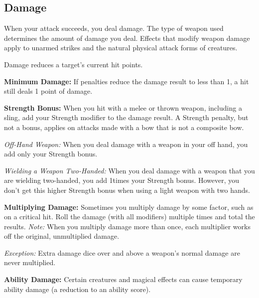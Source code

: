 \subsection{Damage}
When your attack succeeds, you deal damage. The type of weapon used determines the amount of damage you deal. Effects that modify weapon damage apply to unarmed strikes and the natural physical attack forms of creatures.

Damage reduces a target's current hit points.

\textbf{Minimum Damage:} If penalties reduce the damage result to less than 1, a hit still deals 1 point of damage.

\textbf{Strength Bonus:} When you hit with a melee or thrown weapon, including a sling, add your Strength modifier to the damage result. A Strength penalty, but not a bonus, applies on attacks made with a bow that is not a composite bow.

\textit{Off-Hand Weapon:} When you deal damage with a weapon in your off hand, you add only \onehalf your Strength bonus.

\textit{Wielding a Weapon Two-Handed:} When you deal damage with a weapon that you are wielding two-handed, you add 1\onehalf times your Strength bonus. However, you don't get this higher Strength bonus when using a light weapon with two hands.

\textbf{Multiplying Damage:} Sometimes you multiply damage by some factor, such as on a critical hit. Roll the damage (with all modifiers) multiple times and total the results. \textit{Note:} When you multiply damage more than once, each multiplier works off the original, unmultiplied damage.

\textit{Exception:} Extra damage dice over and above a weapon's normal damage are never multiplied.

\textbf{Ability Damage:} Certain creatures and magical effects can cause temporary ability damage (a reduction to an ability score).